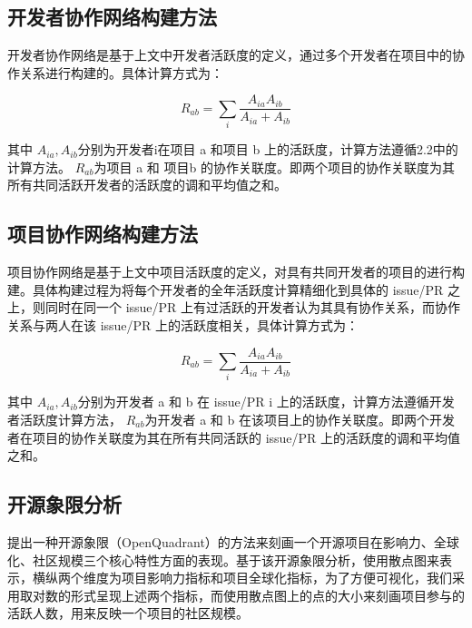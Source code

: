 \subsection{​开发者协作网络构建方法}
开发者协作网络是基于上文中开发者活跃度的定义，通过多个开发者在项目中的协作关系进行构建的。具体计算方式为：

$$ R_{ab}=\sum_{i}{\frac{A_{ia}A_{ib}}{A_{ia}+A_{ib}}} $$

其中 $ A_{ia}, A_{ib} $分别为开发者i在项目 a 和项目 b 上的活跃度，计算方法遵循2.2中的计算方法。 $ R_{ab} $为项目 a 和 项目b 的协作关联度。即两个项目的协作关联度为其所有共同活跃开发者的活跃度的调和平均值之和。

\subsection{项目协作网络构建方法}
项目协作网络是基于上文中项目活跃度的定义，对具有共同开发者的项目的进行构建。具体构建过程为将每个开发者的全年活跃度计算精细化到具体的 issue/PR 之上，则同时在同一个 issue/PR 上有过活跃的开发者认为其具有协作关系，而协作关系与两人在该 issue/PR 上的活跃度相关，具体计算方式为：

$$ R_{ab}=\sum_{i}{\frac{A_{ia}A_{ib}}{A_{ia}+A_{ib}}} $$

其中 $ A_{ia}, A_{ib} $分别为开发者 a 和 b 在 issue/PR i 上的活跃度，计算方法遵循开发者活跃度计算方法， $ R_{ab} $为开发者 a 和 b 在该项目上的协作关联度。即两个开发者在项目的协作关联度为其在所有共同活跃的 issue/PR 上的活跃度的调和平均值之和。

\subsection{开源象限分析}
\par 提出一种开源象限（OpenQuadrant）的方法来刻画一个开源项目在影响力、全球化、社区规模三个核心特性方面的表现。基于该开源象限分析，使用散点图来表示，横纵两个维度为项目影响力指标和项目全球化指标，为了方便可视化，我们采用取对数的形式呈现上述两个指标，而使用散点图上的点的大小来刻画项目参与的活跃人数，用来反映一个项目的社区规模。\cite{vasilescu2015quality}


